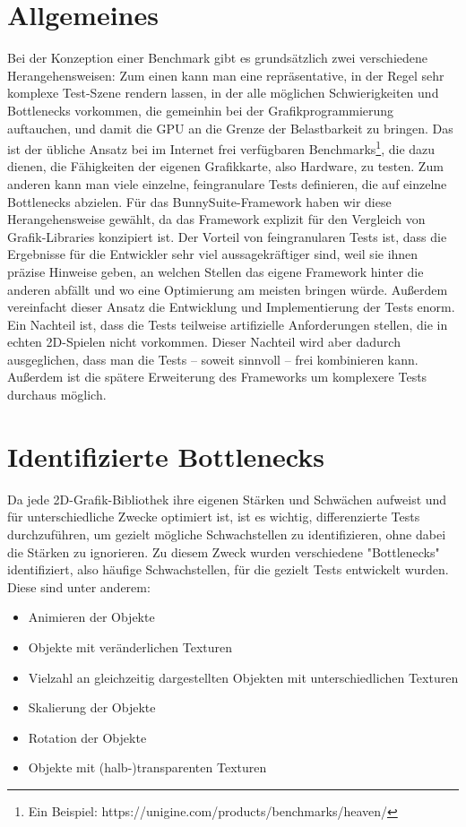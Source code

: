 \section{Allgemeines}
Bei der Konzeption einer Benchmark gibt es grundsätzlich zwei verschiedene Herangehensweisen: Zum einen kann man eine repräsentative, in der Regel sehr komplexe Test-Szene rendern lassen, in der alle möglichen Schwierigkeiten und Bottlenecks vorkommen, die gemeinhin bei der Grafikprogrammierung auftauchen, und damit die GPU an die Grenze der Belastbarkeit zu bringen. Das ist der übliche Ansatz bei im Internet frei verfügbaren Benchmarks\footnote{Ein Beispiel: https://unigine.com/products/benchmarks/heaven/}, die dazu dienen, die Fähigkeiten der eigenen Grafikkarte, also Hardware, zu testen. Zum anderen kann man viele einzelne, feingranulare Tests definieren, die auf einzelne Bottlenecks abzielen. Für das BunnySuite-Framework haben wir diese Herangehensweise gewählt, da das Framework explizit für den Vergleich von Grafik-Libraries konzipiert ist. Der Vorteil von feingranularen Tests ist, dass die Ergebnisse für die Entwickler sehr viel aussagekräftiger sind, weil sie ihnen präzise Hinweise geben, an welchen Stellen das eigene Framework hinter die anderen abfällt und wo eine Optimierung am meisten bringen würde. Außerdem vereinfacht dieser Ansatz die Entwicklung und Implementierung der Tests enorm. Ein Nachteil ist, dass die Tests teilweise artifizielle Anforderungen stellen, die in echten 2D-Spielen nicht vorkommen. Dieser Nachteil wird aber dadurch ausgeglichen, dass man die Tests -- soweit sinnvoll -- frei kombinieren kann. Außerdem ist die spätere Erweiterung des Frameworks um komplexere Tests durchaus möglich.

\section{Identifizierte Bottlenecks}
Da jede 2D-Grafik-Bibliothek ihre eigenen Stärken und Schwächen aufweist und für unterschiedliche Zwecke optimiert ist, ist es wichtig, differenzierte Tests durchzuführen, um gezielt mögliche Schwachstellen zu identifizieren, ohne dabei die Stärken zu ignorieren. Zu diesem Zweck wurden verschiedene "Bottlenecks" identifiziert, also häufige Schwachstellen, für die gezielt Tests entwickelt wurden. Diese sind unter anderem:\\
\begin{itemize}
\item Animieren der Objekte
\item Objekte mit veränderlichen Texturen
\item Vielzahl an gleichzeitig dargestellten Objekten mit unterschiedlichen Texturen
\item Skalierung der Objekte
\item Rotation der Objekte
\item Objekte mit (halb-)transparenten Texturen
\end{itemize}

